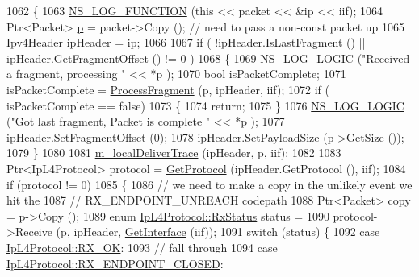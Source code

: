 \begin{DoxyCode}
1062 \{
1063   \hyperlink{log-macros-disabled_8h_a90b90d5bad1f39cb1b64923ea94c0761}{NS\_LOG\_FUNCTION} (\textcolor{keyword}{this} << packet << &ip << iif);
1064   Ptr<Packet> \hyperlink{lte__link__budget_8m_ac9de518908a968428863f829398a4e62}{p} = packet->Copy (); \textcolor{comment}{// need to pass a non-const packet up}
1065   Ipv4Header ipHeader = ip;
1066 
1067   \textcolor{keywordflow}{if} ( !ipHeader.IsLastFragment () || ipHeader.GetFragmentOffset () != 0 )
1068     \{
1069       \hyperlink{group__logging_ga88acd260151caf2db9c0fc84997f45ce}{NS\_LOG\_LOGIC} (\textcolor{stringliteral}{"Received a fragment, processing "} << *p );
1070       \textcolor{keywordtype}{bool} isPacketComplete;
1071       isPacketComplete = \hyperlink{classns3_1_1Ipv4L3Protocol_a981e183413dccdf40f91d1de4f728f63}{ProcessFragment} (p, ipHeader, iif);
1072       \textcolor{keywordflow}{if} ( isPacketComplete == \textcolor{keyword}{false})
1073         \{
1074           \textcolor{keywordflow}{return};
1075         \}
1076       \hyperlink{group__logging_ga88acd260151caf2db9c0fc84997f45ce}{NS\_LOG\_LOGIC} (\textcolor{stringliteral}{"Got last fragment, Packet is complete "} << *p );
1077       ipHeader.SetFragmentOffset (0);
1078       ipHeader.SetPayloadSize (p->GetSize ());
1079     \}
1080 
1081   \hyperlink{classns3_1_1Ipv4L3Protocol_a70adc805da9b70e8fb6f2a998f4df446}{m\_localDeliverTrace} (ipHeader, p, iif);
1082 
1083   Ptr<IpL4Protocol> protocol = \hyperlink{classns3_1_1Ipv4L3Protocol_acbe71267a0b2bca4569cf574148d3361}{GetProtocol} (ipHeader.GetProtocol (), iif);
1084   \textcolor{keywordflow}{if} (protocol != 0)
1085     \{
1086       \textcolor{comment}{// we need to make a copy in the unlikely event we hit the}
1087       \textcolor{comment}{// RX\_ENDPOINT\_UNREACH codepath}
1088       Ptr<Packet> copy = p->Copy ();
1089       \textcolor{keyword}{enum} \hyperlink{classns3_1_1IpL4Protocol_afd3744c89902fff232e2fd45f558c80e}{IpL4Protocol::RxStatus} status = 
1090         protocol->Receive (p, ipHeader, \hyperlink{classns3_1_1Ipv4L3Protocol_ad58abef6f890f3cc2cf291159a3b8588}{GetInterface} (iif));
1091       \textcolor{keywordflow}{switch} (status) \{
1092         \textcolor{keywordflow}{case} \hyperlink{classns3_1_1IpL4Protocol_afd3744c89902fff232e2fd45f558c80eabd979bce2f3b22521c81c4115c66317e}{IpL4Protocol::RX\_OK}:
1093         \textcolor{comment}{// fall through}
1094         \textcolor{keywordflow}{case} \hyperlink{classns3_1_1IpL4Protocol_afd3744c89902fff232e2fd45f558c80eac7f4577d3ab1a219d6cb2b6964c49afd}{IpL4Protocol::RX\_ENDPOINT\_CLOSED}:

\end{DoxyCode}
